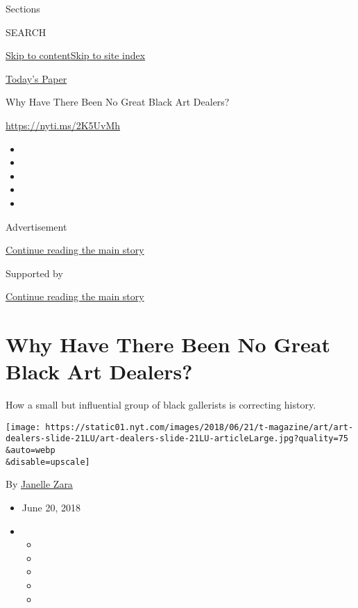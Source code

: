Sections

SEARCH

\protect\hyperlink{site-content}{Skip to
content}\protect\hyperlink{site-index}{Skip to site index}

\href{https://myaccount.nytimes.com/auth/login?response_type=cookie\&client_id=vi}{}

\href{https://www.nytimes.com/section/todayspaper}{Today's Paper}

Why Have There Been No Great Black Art Dealers?

\href{https://nyti.ms/2K5UvMh}{https://nyti.ms/2K5UvMh}

\begin{itemize}
\item
\item
\item
\item
\item
\end{itemize}

Advertisement

\protect\hyperlink{after-top}{Continue reading the main story}

Supported by

\protect\hyperlink{after-sponsor}{Continue reading the main story}

\hypertarget{why-have-there-been-no-great-black-art-dealers}{%
\section{Why Have There Been No Great Black Art
Dealers?}\label{why-have-there-been-no-great-black-art-dealers}}

How a small but influential group of black gallerists is correcting
history.

\texttt{[image: https://static01.nyt.com/images/2018/06/21/t-magazine/art/art-dealers-slide-21LU/art-dealers-slide-21LU-articleLarge.jpg?quality=75\\\&auto=webp\\\&disable=upscale]}

By \href{https://www.nytimes.com/by/janelle-zara}{Janelle Zara}

\begin{itemize}
\item
  June 20, 2018
\item
  \begin{itemize}
  \item
  \item
  \item
  \item
  \item
  \end{itemize}
\end{itemize}

